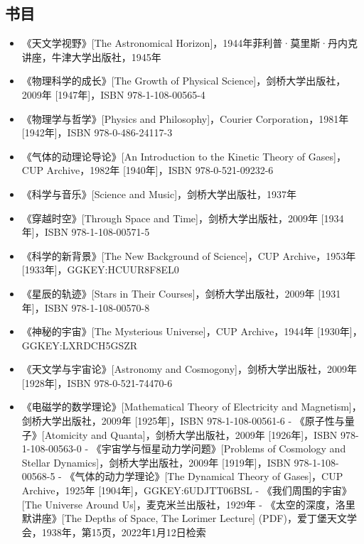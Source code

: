 \subsection{书目}  
\begin{itemize}
\item 《天文学视野》[The Astronomical Horizon]，1944年菲利普·莫里斯·丹内克讲座，牛津大学出版社，1945年  
\item 《物理科学的成长》[The Growth of Physical Science]，剑桥大学出版社，2009年 [1947年]，ISBN 978-1-108-00565-4  
\item 《物理学与哲学》[Physics and Philosophy]，Courier Corporation，1981年 [1942年]，ISBN 978-0-486-24117-3  
\item 《气体的动理论导论》[An Introduction to the Kinetic Theory of Gases]，CUP Archive，1982年 [1940年]，ISBN 978-0-521-09232-6  
\item 《科学与音乐》[Science and Music]，剑桥大学出版社，1937年  
\item 《穿越时空》[Through Space and Time]，剑桥大学出版社，2009年 [1934年]，ISBN 978-1-108-00571-5  
\item 《科学的新背景》[The New Background of Science]，CUP Archive，1953年 [1933年]，GGKEY:HCUUR8F8EL0  
\item 《星辰的轨迹》[Stars in Their Courses]，剑桥大学出版社，2009年 [1931年]，ISBN 978-1-108-00570-8  
\item 《神秘的宇宙》[The Mysterious Universe]，CUP Archive，1944年 [1930年]，GGKEY:LXRDCH5GSZR  
\item 《天文学与宇宙论》[Astronomy and Cosmogony]，剑桥大学出版社，2009年 [1928年]，ISBN 978-0-521-74470-6  
\item 《电磁学的数学理论》[Mathematical Theory of Electricity and Magnetism]，剑桥大学出版社，2009年 [1925年]，ISBN 978-1-108-00561-6  
- 《原子性与量子》[Atomicity and Quanta]，剑桥大学出版社，2009年 [1926年]，ISBN 978-1-108-00563-0  
- 《宇宙学与恒星动力学问题》[Problems of Cosmology and Stellar Dynamics]，剑桥大学出版社，2009年 [1919年]，ISBN 978-1-108-00568-5  
- 《气体的动力学理论》[The Dynamical Theory of Gases]，CUP Archive，1925年 [1904年]，GGKEY:6UDJTT06BSL  
- 《我们周围的宇宙》[The Universe Around Us]，麦克米兰出版社，1929年  
- 《太空的深度，洛里默讲座》[The Depths of Space, The Lorimer Lecture] (PDF)，爱丁堡天文学会，1938年，第15页，2022年1月12日检索
\end{itemize}